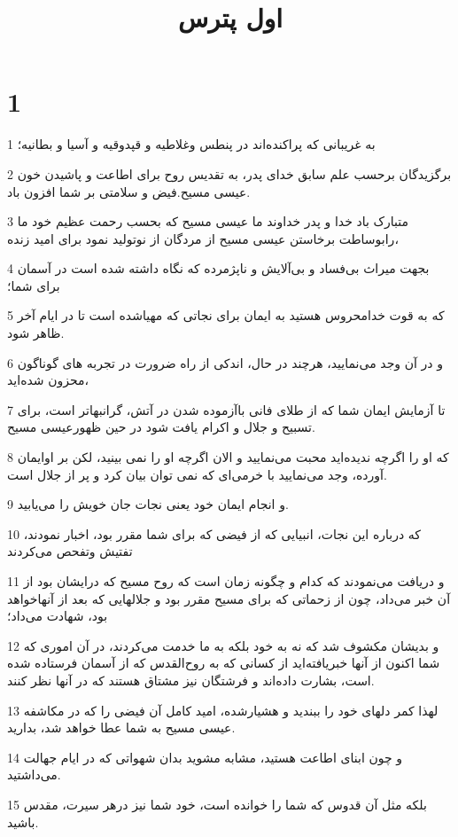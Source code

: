 

\title{اول پترس}


\chapter{1}

\par 1 به غریبانی که پراکنده‌اند در پنطس وغلاطیه و قپدوقیه و آسیا و بطانیه؛
\par 2 برگزیدگان برحسب علم سابق خدای پدر، به تقدیس روح برای اطاعت و پاشیدن خون عیسی مسیح.فیض و سلامتی بر شما افزون باد.
\par 3 متبارک باد خدا و پدر خداوند ما عیسی مسیح که بحسب رحمت عظیم خود ما رابوساطت برخاستن عیسی مسیح از مردگان از نوتولید نمود برای امید زنده،
\par 4 بجهت میراث بی‌فساد و بی‌آلایش و ناپژمرده که نگاه داشته شده است در آسمان برای شما؛
\par 5 که به قوت خدامحروس هستید به ایمان برای نجاتی که مهیاشده است تا در ایام آخر ظاهر شود.
\par 6 و در آن وجد می‌نمایید، هرچند در حال، اندکی از راه ضرورت در تجربه های گوناگون محزون شده‌اید،
\par 7 تا آزمایش ایمان شما که از طلای فانی باآزموده شدن در آتش، گرانبهاتر است، برای تسبیح و جلال و اکرام یافت شود در حین ظهورعیسی مسیح.
\par 8 که او را اگرچه ندیده‌اید محبت می‌نمایید و الان اگرچه او را نمی بینید، لکن بر اوایمان آورده، وجد می‌نمایید با خرمی‌ای که نمی توان بیان کرد و پر از جلال است.
\par 9 و انجام ایمان خود یعنی نجات جان خویش را می‌یابید.
\par 10 که درباره این نجات، انبیایی که از فیضی که برای شما مقرر بود، اخبار نمودند، تفتیش وتفحص می‌کردند
\par 11 و دریافت می‌نمودند که کدام و چگونه زمان است که روح مسیح که درایشان بود از آن خبر می‌داد، چون از زحماتی که برای مسیح مقرر بود و جلالهایی که بعد از آنهاخواهد بود، شهادت می‌داد؛
\par 12 و بدیشان مکشوف شد که نه به خود بلکه به ما خدمت می‌کردند، در آن اموری که شما اکنون از آنها خبریافته‌اید از کسانی که به روح‌القدس که از آسمان فرستاده شده است، بشارت داده‌اند و فرشتگان نیز مشتاق هستند که در آنها نظر کنند.
\par 13 لهذا کمر دلهای خود را ببندید و هشیارشده، امید کامل آن فیضی را که در مکاشفه عیسی مسیح به شما عطا خواهد شد، بدارید.
\par 14 و چون ابنای اطاعت هستید، مشابه مشوید بدان شهواتی که در ایام جهالت می‌داشتید.
\par 15 بلکه مثل آن قدوس که شما را خوانده است، خود شما نیز درهر سیرت، مقدس باشید.
